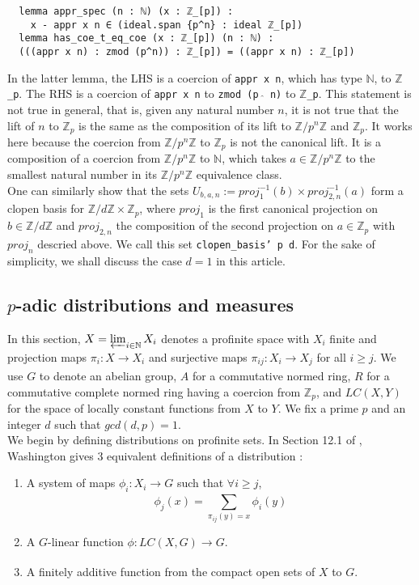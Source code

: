\documentclass[11pt]{article}
\newcommand{\lean}[1]{\texttt{#1}\xspace} %
\begin{document}
\begin{lstlisting}
  lemma appr_spec (n : ℕ) (x : ℤ_[p]) :  
    x - appr x n ∈ (ideal.span {p^n} : ideal ℤ_[p])
  lemma has_coe_t_eq_coe (x : ℤ_[p]) (n : ℕ) :
  (((appr x n) : zmod (p^n)) : ℤ_[p]) = ((appr x n) : ℤ_[p])
\end{lstlisting}

In the latter lemma, the LHS is a coercion of \lean{appr x n}, which has type \lean{$\mathbb{N}$}, to \lean{$\mathbb{Z}$\_p}. 
The RHS is a coercion of \lean{appr x n} to \lean{zmod (p $\hat{}$ n)} to \lean{$\mathbb{Z}$\_p}. 
This statement is not true in general, that is, given any natural number $n$, it is not true that the lift of $n$ to $\mathbb{Z}_p$ 
is the same as the composition of its lift to $\mathbb{Z}/p^n \mathbb{Z}$ and $\mathbb{Z}_p$. 
It works here because the coercion from $\mathbb{Z}/p^n \mathbb{Z}$ to $\mathbb{Z}_p$ is not the canonical lift.
It is a composition of a coercion from $\mathbb{Z}/p^n \mathbb{Z}$ to $\mathbb{N}$, which takes
$a \in \mathbb{Z}/p^n \mathbb{Z}$ to the smallest natural number in its
$\mathbb{Z}/p^n \mathbb{Z}$ equivalence class. \\

One can similarly show that the sets $U_{b, a, n} := proj_1^{-1} (b) \times proj_{2,n} ^{-1} (a)$ form a clopen basis for 
$\mathbb{Z} / d \mathbb{Z} \times \mathbb{Z}_p$, where $proj_1$ is the first canonical projection on $b \in \mathbb{Z} / d \mathbb{Z}$ 
and $proj_{2,n}$ the composition of the second projection on $a \in \mathbb{Z}_p$ with $proj_n$ descried above. We call this set 
\lean{clopen\_basis' p d}. For the sake of simplicity, we shall discuss the case $d = 1$ in this article.

\subsection{$p$-adic distributions and measures}
In this section, $X = \varprojlim_{i \in \mathbb{N}} X_i$ denotes a profinite space with $X_i$ finite and
projection maps $\pi_i : X \xrightarrow[]{} X_i$ and surjective maps
$\pi_{ij} : X_i \xrightarrow[]{} X_j$ for all $i \ge j$. We use $G$ to denote an abelian group,
$A$ for a commutative normed ring, $R$ for a commutative complete normed ring having a coercion from $\mathbb{Z}_p$, 
and $LC(X,Y)$ for the space of locally constant functions from $X$ to $Y$. 
We fix a prime $p$ and an integer $d$ such that $gcd(d, p) =1$. \\

We begin by defining distributions on profinite sets. In Section 12.1 of \cite{cyc}, Washington
gives 3 equivalent definitions of a distribution :
\begin{enumerate}
  \item A system of maps $\phi_i : X_i \xrightarrow[]{} G$ such that $\forall i \ge j$,
  $$ \phi_j(x) = \sum_{\pi_{ij}(y) = x} \phi_i(y) $$
  \item A $G$-linear function $\phi : LC(X, G) \xrightarrow[]{} G$.
  \item A finitely additive function from the compact open sets of $X$ to $G$.
\end{enumerate}
\end{document}
